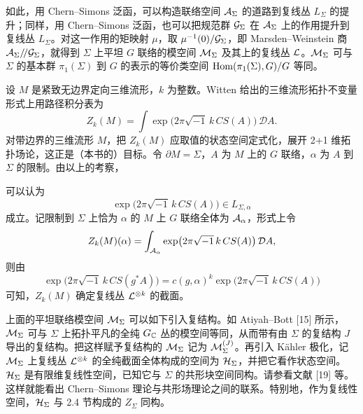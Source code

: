 如此，用 Chern--Simons 泛函，可以构造联络空间 $\mathcal{A}_\Sigma$ 的道路到复线丛 $L_\Sigma$ 的提升；同样，用 Chern--Simons 泛函，也可以把规范群 $\mathcal{G}_\Sigma$ 在 $\mathcal{A}_\Sigma$ 上的作用提升到复线丛 $L_\Sigma$。对这一作用的矩映射 $\mu$，取 $\mu^{-1}(0)/\mathcal{G}_\Sigma$，即 Marsden--Weinstein 商 $\mathcal{A}_\Sigma/\!/\mathcal{G}_\Sigma$，就得到 $\Sigma$ 上平坦 $G$ 联络的模空间 $\mathcal{M}_\Sigma$ 及其上的复线丛 $\mathcal{L}$。$\mathcal{M}_\Sigma$ 可与 $\Sigma$ 的基本群 $\pi_1(\Sigma)$ 到 $G$ 的表示的等价类空间 $\operatorname{Hom}(\pi_1(\Sigma),G)/G$ 等同。


设 $M$ 是紧致无边界定向三维流形，$k$ 为整数。Witten 给出的三维流形拓扑不变量形式上用路径积分表为
\begin{equation*}
  Z_k(M)=\int\exp\bigl(2\pi\sqrt{-1}\,k\,CS(A)\bigr)\,\mathcal{D}A.
\end{equation*}
对带边界的三维流形 $M$，把 $Z_k(M)$ 应取值的状态空间定式化，展开 2+1 维拓扑场论，这正是（本书的）目标。令 $\partial M=\Sigma$，$A$ 为 $M$ 上的 $G$ 联络，$\alpha$ 为 $A$ 到 $\Sigma$ 的限制。由以上的考察，


可以认为
\begin{equation*}
  \exp\bigl(2\pi\sqrt{-1}\,k\,CS(A)\bigr)\in L_{\Sigma,\alpha}
\end{equation*}
成立。记限制到 $\Sigma$ 上恰为 $\alpha$ 的 $M$ 上 $G$ 联络全体为 $\mathcal{A}_\alpha$，形式上令
\begin{equation*}
  Z_k(M)(\alpha)=\int_{\mathcal{A}_\alpha}\exp\bigl(2\pi\sqrt{-1}\,k\,CS(A)\bigr)\,\mathcal{D}A,
\end{equation*}
则由
\begin{equation*}
  \exp\bigl(2\pi\sqrt{-1}\,k\,CS(g^{*}A)\bigr)=c(g,\alpha)^{k}\exp\bigl(2\pi\sqrt{-1}\,k\,CS(A)\bigr)
\end{equation*}
可知，$Z_k(M)$ 确定复线丛 $\mathcal{L}^{\otimes k}$ 的截面。


上面的平坦联络模空间 $\mathcal{M}_\Sigma$ 可以如下引入复结构。如 Atiyah--Bott [15] 所示，$\mathcal{M}_\Sigma$ 可与 $\Sigma$ 上拓扑平凡的全纯 $G_{\mathbb{C}}$ 丛的模空间等同，从而带有由 $\Sigma$ 的复结构 $J$ 导出的复结构。把这样赋予复结构的 $\mathcal{M}_\Sigma$ 记为 $\mathcal{M}_\Sigma^{(J)}$。再引入 Kähler 极化，记 $\mathcal{M}_\Sigma$ 上复线丛 $\mathcal{L}^{\otimes k}$ 的全纯截面全体构成的空间为 $\mathcal{H}_\Sigma$，并把它看作状态空间。$\mathcal{H}_\Sigma$ 是有限维复线性空间，已知它与 $\Sigma$ 的共形块空间同构。请参看文献 [19] 等。这样就能看出 Chern--Simons 理论与共形场理论之间的联系。特别地，作为复线性空间，$\mathcal{H}_\Sigma$ 与 2.4 节构成的 $Z_\Sigma$ 同构。

